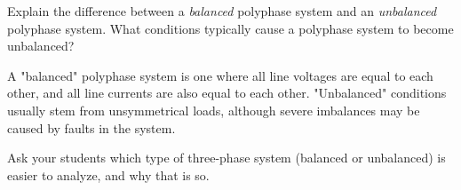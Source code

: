 

Explain the difference between a {\it balanced} polyphase system and an {\it unbalanced} polyphase system.  What conditions typically cause a polyphase system to become unbalanced?







A "balanced" polyphase system is one where all line voltages are equal to each other, and all line currents are also equal to each other.  "Unbalanced" conditions usually stem from unsymmetrical loads, although severe imbalances may be caused by faults in the system.







Ask your students which type of three-phase system (balanced or unbalanced) is easier to analyze, and why that is so.




